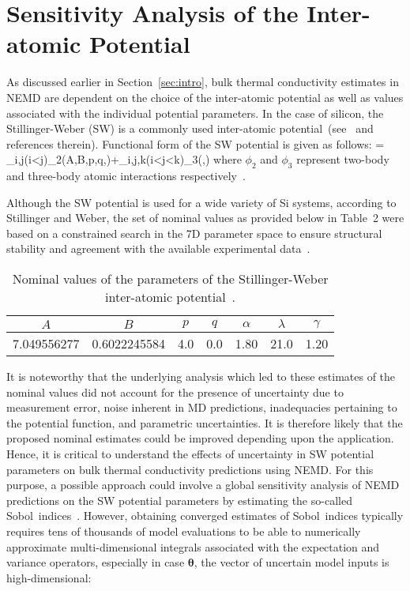 \section{Sensitivity Analysis of the Inter-atomic Potential}
\label{sec:sense}

As discussed earlier in Section~\ref{sec:intro}, bulk thermal conductivity estimates in NEMD
are dependent on the choice of the inter-atomic potential as well as values associated with
the individual potential parameters. In the case of silicon, the Stillinger-Weber (SW)
is a commonly used inter-atomic potential~(see~\cite{Laradji:1995,Zhang:2014,Jiang:2015,Watanabe:1999,Zhou:2013} and references therein). Functional form of the SW potential is given as follows:
%
\be
\Phi = \sum\limits_{i,j(i<j)}\phi_2(A,B,p,q,\alpha)\hspace{1mm}+\sum\limits_{i,j,k(i<j<k)}\phi_3(\lambda,\gamma)
\ee
%
where $\phi_2$ and $\phi_3$ represent two-body and three-body atomic interactions 
respectively~\cite{Stillinger:1985}.

Although the SW potential is used for a wide variety of Si systems, 
according to Stillinger and Weber, the set of nominal
values as provided below in Table~2 were based on a constrained search in the 7D parameter space to ensure structural stability and agreement with the available experimental data~\cite{Stillinger:1985}.

\begin{table}[htbp]
\begin{center}
\begin{tabular}{|c|c|c|c|c|c|c|}
\hline 
$A$ & $B$ & $p$ & $q$ & $\alpha$ & $\lambda$ & $\gamma$ \\
\hline \hline
7.049556277 & 0.6022245584 & 4.0 & 0.0 & 1.80 & 21.0 & 1.20 \\
\hline
\end{tabular}
\end{center}
\caption{Nominal values of the parameters of the Stillinger-Weber inter-atomic
potential~\cite{Stillinger:1985}.}
\end{table}

It is noteworthy that the underlying analysis which led to these estimates of the nominal values did not
account for the presence of uncertainty due to
measurement error, noise inherent in MD predictions, inadequacies pertaining to the potential function,
and parametric uncertainties. It is therefore likely that the proposed nominal estimates could be 
improved depending upon the application. Hence, it is critical to understand the effects of uncertainty in
SW potential parameters on bulk thermal conductivity predictions using NEMD. For this purpose, a possible
approach could involve a global sensitivity analysis of NEMD predictions on the SW potential parameters 
by estimating the so-called Sobol\textquotesingle~indices~\cite{Sobol:2001}. However, obtaining converged estimates of
Sobol\textquotesingle~indices typically requires tens of thousands of model evaluations to be able to numerically approximate
multi-dimensional integrals associated with the expectation and variance operators, especially in case $\bm{\theta}$,
the vector of uncertain model inputs is high-dimensional:

